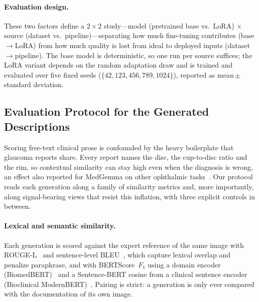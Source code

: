 \documentclass[runningheads]{llncs}
\begin{document}


\paragraph{Evaluation design.}
These two factors define a $2\times2$ study---model (pretrained base vs.\
\gls{LoRA}) $\times$ source (dataset vs.\ pipeline)---separating how much
fine-tuning contributes (base$\rightarrow$\gls{LoRA}) from how much quality is
lost from ideal to deployed inputs (dataset$\rightarrow$pipeline). The base model
is deterministic, so one run per source suffices; the \gls{LoRA} variant depends
on the random adaptation draw and is trained and evaluated over five fixed seeds
($\{42,123,456,789,1024\}$), reported as mean\,$\pm$\,standard deviation.





















\subsection{Evaluation Protocol for the Generated Descriptions}
\label{sec:eval-protocol}

Scoring free-text clinical prose is confounded by the heavy boilerplate that glaucoma reports share. Every report names the disc, the cup-to-disc ratio and the rim, so contextual similarity can stay high even when the diagnosis is wrong, an effect also reported for MedGemma on other ophthalmic tasks~\cite{abreu-cardenas_medgemma_2026}. Our protocol reads each generation along a family of similarity metrics and, more importantly, along signal-bearing views that resist this inflation, with three explicit controls in between.

\paragraph{Lexical and semantic similarity.}
Each generation is scored against the expert reference of the same image with ROUGE-L~\cite{lin2004rouge} and sentence-level BLEU~\cite{papineni2002bleu}, which capture lexical overlap and penalize paraphrase, and with BERTScore~$F_1$ using a domain encoder (BiomedBERT)~\cite{zhang2020bertscore,gu2021biomedbert} and a Sentence-BERT cosine from a clinical sentence encoder (Bioclinical ModernBERT)~\cite{reimers2019sbert}. Pairing is strict: a generation is only ever compared with the documentation of its own image.
\end{document}
